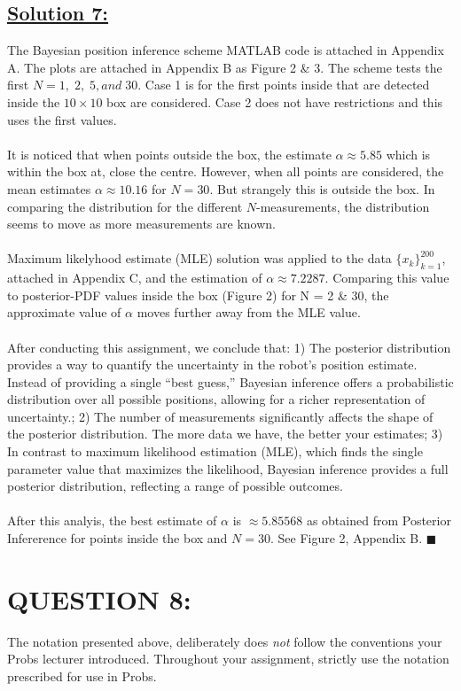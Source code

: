 \documentclass[a4paper,11pt]{article}
\begin{document}
\subsection*{\underline{Solution 7:}}
The Bayesian position inference scheme MATLAB code is attached in Appendix A. The plots are attached in Appendix B as Figure 2 \& 3. The scheme tests the first $N = 1,\; 2, \; 5, and \; 30$. Case 1 is for the first points inside that are detected inside the $10 \times 10$ box are considered. Case 2 does not have restrictions and this uses the first values.\\ \\
It is noticed that when points outside the box, the estimate $\alpha \approx 5.85$ which is within the box at, close the centre. However, when all points are considered, the mean estimates $\alpha \approx 10.16$ for $N = 30$. But strangely this is outside the box.
In comparing the distribution for the different $N$-measurements, the distribution seems to move as more measurements are known. \\ \\
Maximum likelyhood estimate (MLE) solution was applied to the data $\{ x_k \}^{200} _{k = 1}$, attached in Appendix C, and the estimation of $\alpha \approx 7.2287$. Comparing this value to posterior-PDF values inside the box (Figure 2) for N = 2 \& 30, the approximate value of $\alpha$ moves further away from the MLE value.\\\\
After conducting this assignment, we conclude that: 1) The posterior distribution provides a way to quantify the uncertainty in the robot's position estimate. Instead of providing a single “best guess,” Bayesian inference offers a probabilistic distribution over all possible positions, allowing for a richer representation of uncertainty.; 2) The number of measurements significantly affects the shape of the posterior distribution. The more data we have, the better your estimates; 3) In contrast to maximum likelihood estimation (MLE), which finds the single parameter value that maximizes the likelihood, Bayesian inference provides a full posterior distribution, reflecting a range of possible outcomes.\\ \\
After this analyis, the best estimate of $\alpha$ is $\approx 5.85568$ as obtained from Posterior Infererence for points inside the box and $N = 30$. See Figure 2, Appendix B. $\blacksquare$

\section{QUESTION 8:}
The notation presented above, deliberately does \emph{not} follow the conventions your Probs
lecturer introduced. Throughout your assignment, strictly use the notation prescribed for
use in Probs.
\end{document}

